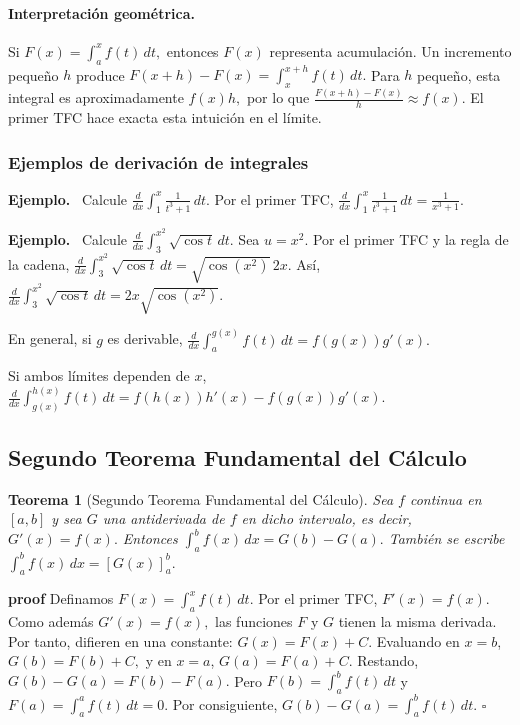 \documentclass[12pt]{article}
\newenvironment{Ejem}
{\par\medskip\noindent\textbf{Ejemplo.}\ }
{\par\medskip}
\newtheorem{Teo}{Teorema}
\begin{document}
\paragraph{Interpretación geométrica.}
Si
$
F(x)=\int_a^x f(t)\,dt,
$
entonces $F(x)$ representa acumulación. Un incremento pequeño $h$ produce
$
F(x+h)-F(x)=\int_x^{x+h}f(t)\,dt.
$
Para $h$ pequeño, esta integral es aproximadamente
$
f(x)h,
$
por lo que
$
\frac{F(x+h)-F(x)}{h}\approx f(x).
$
El primer TFC hace exacta esta intuición en el límite.
\subsubsection*{Ejemplos de derivación de integrales}
\begin{Ejem}
Calcule
$
\frac{d}{dx}\int_1^x\frac{1}{t^3+1}\,dt.
$
Por el primer TFC,
$
\boxed{
\frac{d}{dx}\int_1^x\frac{1}{t^3+1}\,dt
=
\frac{1}{x^3+1}.
}
$
\end{Ejem}

\begin{Ejem}
Calcule
$
\frac{d}{dx}\int_3^{x^2}\sqrt{\cos t}\,dt.
$
Sea
$
u=x^2.
$
Por el primer TFC y la regla de la cadena,
$
\frac{d}{dx}\int_3^{x^2}\sqrt{\cos t}\,dt
=
\sqrt{\cos(x^2)}\,2x.
$
Así,
$
\boxed{
\frac{d}{dx}\int_3^{x^2}\sqrt{\cos t}\,dt
=
2x\sqrt{\cos(x^2)}.
}
$
\end{Ejem}

En general, si $g$ es derivable,
$
\boxed{
\frac{d}{dx}\int_a^{g(x)}f(t)\,dt
=
f(g(x))g'(x).
}
$

Si ambos límites dependen de $x$,
$
\boxed{
\frac{d}{dx}\int_{g(x)}^{h(x)}f(t)\,dt
=
f(h(x))h'(x)-f(g(x))g'(x).
}
$
\subsection*{Segundo Teorema Fundamental del Cálculo}
\begin{Teo}[Segundo Teorema Fundamental del Cálculo]
Sea $f$ continua en $[a,b]$ y sea $G$ una antiderivada de $f$ en dicho
intervalo, es decir,
$
G'(x)=f(x).
$
Entonces
$
\boxed{
\int_a^b f(x)\,dx=G(b)-G(a).
}
$
También se escribe
$
\boxed{
\int_a^b f(x)\,dx=\left[G(x)\right]_a^b.
}
$
\end{Teo}

\textbf{proof}
Definamos
$
F(x)=\int_a^x f(t)\,dt.
$
Por el primer TFC,
$
F'(x)=f(x).
$
Como además
$
G'(x)=f(x),
$
las funciones $F$ y $G$ tienen la misma derivada. Por tanto, difieren en una
constante:
$
G(x)=F(x)+C.
$
Evaluando en $x=b$,
$
G(b)=F(b)+C,
$
y en $x=a$,
$
G(a)=F(a)+C.
$
Restando,
$
G(b)-G(a)=F(b)-F(a).
$
Pero
$
F(b)=\int_a^b f(t)\,dt
$
y
$
F(a)=\int_a^a f(t)\,dt=0.
$
Por consiguiente,
$
G(b)-G(a)=\int_a^b f(t)\,dt.
$
\hfill$\square$
\end{document}
